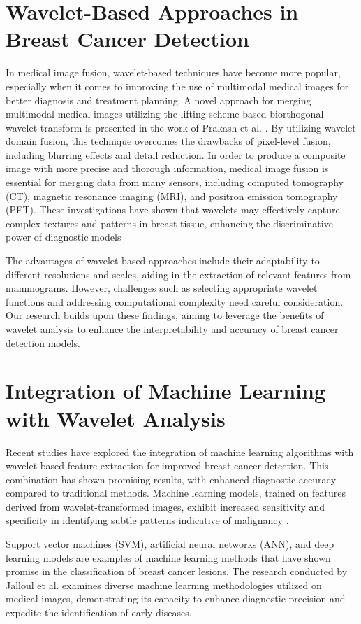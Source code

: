 \section{Wavelet-Based Approaches in Breast Cancer Detection}
In medical image fusion, wavelet-based techniques have become more popular, especially when it comes to improving the use of multimodal medical images for better diagnosis and treatment planning. A novel approach for merging multimodal medical images utilizing the lifting scheme-based biorthogonal wavelet transform is presented in the work of Prakash et al. \cite{Multiscale}. By utilizing wavelet domain fusion, this technique overcomes the drawbacks of pixel-level fusion, including blurring effects and detail reduction. In order to produce a composite image with more precise and thorough information, medical image fusion is essential for merging data from many sensors, including computed tomography (CT), magnetic resonance imaging (MRI), and positron emission tomography (PET). These investigations have shown that wavelets may effectively capture complex textures and patterns in breast tissue, enhancing the discriminative power of diagnostic models \cite{Multiscale}

The advantages of wavelet-based approaches include their adaptability to different resolutions and scales, aiding in the extraction of relevant features from mammograms. However, challenges such as selecting appropriate wavelet functions and addressing computational complexity need careful consideration. Our research builds upon these findings, aiming to leverage the benefits of wavelet analysis to enhance the interpretability and accuracy of breast cancer detection models.
\section{Integration of Machine Learning with Wavelet Analysis}
Recent studies have explored the integration of machine learning algorithms with wavelet-based feature extraction for improved breast cancer detection. This combination has shown promising results, with enhanced diagnostic accuracy compared to traditional methods. Machine learning models, trained on features derived from wavelet-transformed images, exhibit increased sensitivity and specificity in identifying subtle patterns indicative of malignancy \cite{Tumor}.

Support vector machines (SVM), artificial neural networks (ANN), and deep learning models are examples of machine learning methods that have shown promise in the classification of breast cancer lesions. The research conducted by Jalloul et al. \cite{Ovarian} examines diverse machine learning methodologies utilized on medical images, demonstrating its capacity to enhance diagnostic precision and expedite the identification of early diseases.

